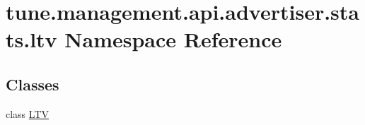 \hypertarget{namespacetune_1_1management_1_1api_1_1advertiser_1_1stats_1_1ltv}{\section{tune.\-management.\-api.\-advertiser.\-stats.\-ltv Namespace Reference}
\label{namespacetune_1_1management_1_1api_1_1advertiser_1_1stats_1_1ltv}
}
\subsection*{Classes}
\begin{DoxyCompactItemize}
\item 
class \hyperlink{classtune_1_1management_1_1api_1_1advertiser_1_1stats_1_1ltv_1_1LTV}{L\-T\-V}
\end{DoxyCompactItemize}
